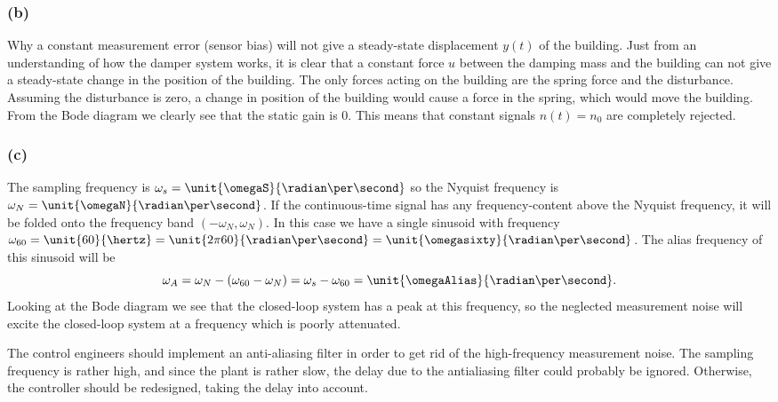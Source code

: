 \documentclass[letterpaper,11pt]{article}
\begin{document}
\subsubsection*{(b)}
Why a constant measurement error (sensor bias) will not give a steady-state displacement $y(t)$ of the building. Just from an understanding of how the damper system works, it is clear that a constant force $u$ between the damping mass and the building can not give a steady-state change in the position of the building. The only forces acting on the building are the spring force and the disturbance. Assuming the disturbance is zero, a change in position of the building would cause a force in the spring, which would move the building. From the Bode diagram we clearly see that the static gain is 0. This means that constant signals $n(t)=n_0$ are completely rejected. 

\subsubsection*{(c)}
\pgfmathsetmacro{\omegaAlias}{\omegaS - \omegasixty}

The sampling frequency is $\omega_s = \unit{\omegaS}{\radian\per\second}$ so the Nyquist frequency is \(\omega_N = \unit{\omegaN}{\radian\per\second}\). If the continuous-time signal has any frequency-content above the Nyquist frequency, it will be folded onto the frequency band \((-\omega_N, \omega_N)\). In this case we have a single sinusoid with frequency \(\omega_{60}=\unit{60}{\hertz} = \unit{2\pi 60}{\radian\per\second} = \unit{\omegasixty}{\radian\per\second}\). The alias frequency of this sinusoid will be 
\[\omega_A = \omega_N - (\omega_{60} - \omega_N) = \omega_s - \omega_{60} = \unit{\omegaAlias}{\radian\per\second}.\]
Looking at the Bode diagram we see that the closed-loop system has a peak at this frequency, so the neglected measurement noise will excite the closed-loop system at a frequency which is poorly attenuated. 

The control engineers should implement an anti-aliasing filter in order to get rid of the high-frequency measurement noise. The sampling frequency is rather high, and since the plant is rather slow, the delay due to the antialiasing filter could probably be ignored. Otherwise, the controller should be redesigned, taking the delay into account. 
\end{document}
